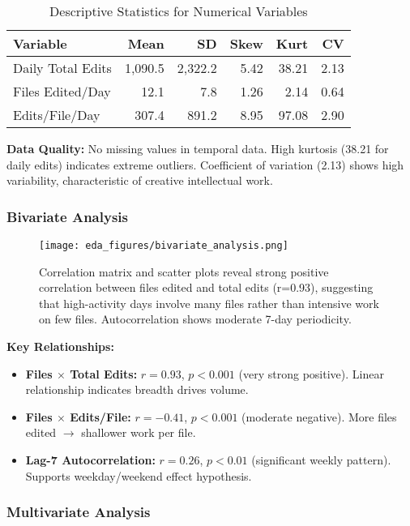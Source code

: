 \documentclass[11pt]{article}
\begin{document}
\begin{table}[H]
\centering
\caption{Descriptive Statistics for Numerical Variables}
\small
\begin{tabular}{@{}lrrrrr@{}}
\toprule
\textbf{Variable} & \textbf{Mean} & \textbf{SD} & \textbf{Skew} & \textbf{Kurt} & \textbf{CV} \\ \midrule
Daily Total Edits & 1,090.5 & 2,322.2 & 5.42 & 38.21 & 2.13 \\
Files Edited/Day & 12.1 & 7.8 & 1.26 & 2.14 & 0.64 \\
Edits/File/Day & 307.4 & 891.2 & 8.95 & 97.08 & 2.90 \\ \bottomrule
\end{tabular}
\end{table}

\textbf{Data Quality:} No missing values in temporal data. High kurtosis (38.21 for daily edits) indicates extreme outliers. Coefficient of variation (2.13) shows high variability, characteristic of creative intellectual work.

\subsubsection{Bivariate Analysis}

\begin{figure}[H]
\centering
\texttt{[image: eda\_figures/bivariate\_analysis.png]}
\caption{Correlation matrix and scatter plots reveal strong positive correlation between files edited and total edits (r=0.93), suggesting that high-activity days involve many files rather than intensive work on few files. Autocorrelation shows moderate 7-day periodicity.}
\end{figure}

\textbf{Key Relationships:}
\begin{itemize}
    \item \textbf{Files $\times$ Total Edits:} $r = 0.93$, $p < 0.001$ (very strong positive). Linear relationship indicates breadth drives volume.
    \item \textbf{Files $\times$ Edits/File:} $r = -0.41$, $p < 0.001$ (moderate negative). More files edited $\rightarrow$ shallower work per file.
    \item \textbf{Lag-7 Autocorrelation:} $r = 0.26$, $p < 0.01$ (significant weekly pattern). Supports weekday/weekend effect hypothesis.
\end{itemize}

\subsubsection{Multivariate Analysis}
\end{document}
